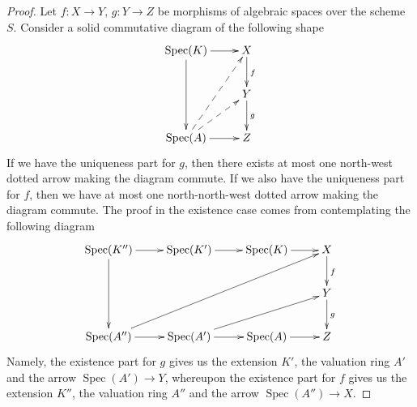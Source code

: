 \documentclass[10pt,a4paper]{amsart}
\theoremstyle{plain}
\theoremstyle{definition}
\theoremstyle{remark}
\numberwithin{equation}{subsection}
\def\Spec{\mathop{\mathrm{Spec}}}
\begin{document}
\begin{proof}
Let $f : X \to Y$, $g : Y \to Z$ be morphisms of algebraic spaces over the
scheme $S$. Consider a solid commutative diagram of the following shape
$$
\xymatrix{
\Spec(K) \ar[dd] \ar[r] & X \ar[d]^f \\
& Y \ar[d]^g \\
\Spec(A) \ar[r] \ar@{-->}[ru] \ar@{-->}[ruu] & Z
}
$$
If we have the uniqueness part for $g$, then there exists at
most one north-west dotted arrow making the diagram commute.
If we also have the uniqueness part for $f$, then we have
at most one north-north-west dotted arrow making the diagram
commute. The proof in the existence case comes from contemplating
the following diagram
$$
\xymatrix{
\Spec(K'') \ar[r] \ar[dd] &
\Spec(K') \ar[r] &
\Spec(K) \ar[r] &
X \ar[d]^f \\
& & & Y \ar[d]^g \\
\Spec(A'') \ar[r] \ar[rrruu] &
\Spec(A') \ar[r] \ar[rru] &
\Spec(A) \ar[r] &
Z
}
$$
Namely, the existence part for $g$ gives us the extension $K'$, the
valuation ring $A'$ and the arrow $\Spec(A') \to Y$, whereupon
the existence part for $f$ gives us the extension $K''$, the
valuation ring $A''$ and the arrow $\Spec(A'') \to X$.
\end{proof}
\end{document}

